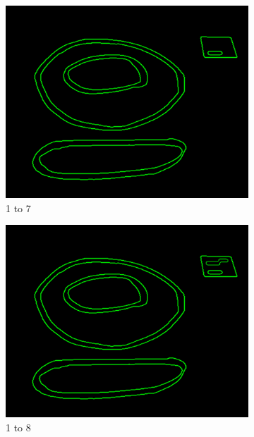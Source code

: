 \documentclass[11pt]{article}
\begin{document}
\begin{figure}[H]
	
	\begin{subfigure}[t]{0.32\textwidth}
	\centering
		\includegraphics[scale=0.28]{pics/elimination/joinedAfterRemoval7.png}
		\caption{1 to 7}
		\label{construction7}
	\end{subfigure}
	\begin{subfigure}[t]{0.32\textwidth}
	\centering
		\includegraphics[scale=0.28]{pics/elimination/joinedAfterRemoval8.png}
		\caption{1 to 8}
		\label{construction8}
	\end{subfigure}
	\begin{subfigure}[t]{0.32\textwidth}
	\centering

\end{subfigure}
\end{figure}
\end{document}
